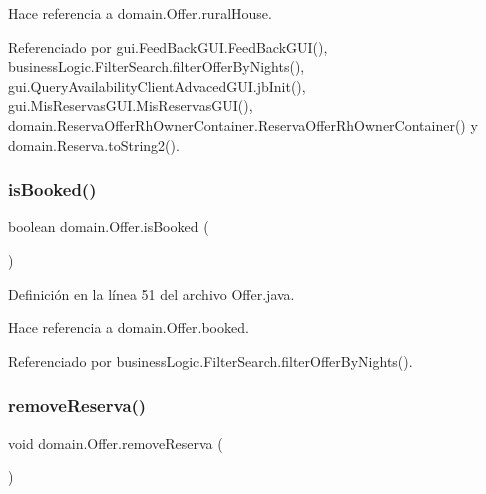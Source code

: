 Hace referencia a domain.\+Offer.\+rural\+House.



Referenciado por gui.\+Feed\+Back\+G\+U\+I.\+Feed\+Back\+G\+U\+I(), business\+Logic.\+Filter\+Search.\+filter\+Offer\+By\+Nights(), gui.\+Query\+Availability\+Client\+Advaced\+G\+U\+I.\+jb\+Init(), gui.\+Mis\+Reservas\+G\+U\+I.\+Mis\+Reservas\+G\+U\+I(), domain.\+Reserva\+Offer\+Rh\+Owner\+Container.\+Reserva\+Offer\+Rh\+Owner\+Container() y domain.\+Reserva.\+to\+String2().

\mbox{\label{classdomain_1_1_offer_a41a1c7ea6658ff5e9127ad3d2332ef9c}} 
\subsubsection{\texorpdfstring{isBooked()}{isBooked()}}
{\footnotesize\ttfamily boolean domain.\+Offer.\+is\+Booked (\begin{DoxyParamCaption}{ }\end{DoxyParamCaption})}



Definición en la línea 51 del archivo Offer.\+java.


\begin{DoxyCode}{0}

\end{DoxyCode}


Hace referencia a domain.\+Offer.\+booked.



Referenciado por business\+Logic.\+Filter\+Search.\+filter\+Offer\+By\+Nights().

\mbox{\label{classdomain_1_1_offer_a78634284385de3610a3fdc8ef08763fa}} 
\subsubsection{\texorpdfstring{removeReserva()}{removeReserva()}}
{\footnotesize\ttfamily void domain.\+Offer.\+remove\+Reserva (\begin{DoxyParamCaption}{ }\end{DoxyParamCaption})}



